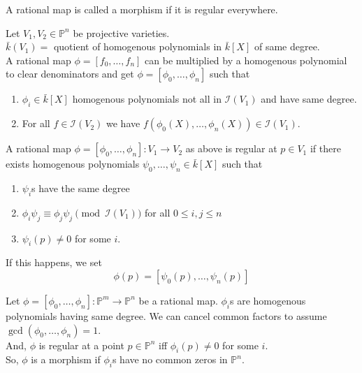 \documentclass[oneside, 12pt]{scrbook}
\newcommand{\I}{\mathcal{I}}
\newcommand{\PP}{\mathbb{P}}
\theoremstyle{theorem}
\begin{document}
\begin{definition}
A rational map is called a morphism if it is regular everywhere.
\end{definition}

\begin{remark}
Let $V_{1},V_{2} \in \PP^n$ be projective varieties. \\
$\bar{k}(V_{1}) = $ quotient of homogenous polynomials in $\bar{k}[X]$ of same degree.\\ 
A rational map $\phi = [f_{0}, \hdots , f_{n}]$ can be multiplied by a homogenous polynomial to clear denominators and get $\phi = [\phi_{0} , \hdots ,  \phi_{n}]$ such that 
\begin{enumerate}
\item $\phi_{i} \in \bar{k}[X]$ homogenous polynomials not all in $\I(V_{1})$ and have same degree.
\item For all $f \in \I(V_{2})$ we have $f(\phi_{0}(X), \hdots , \phi_{n}(X)) \in \I(V_{1})$. 
\end{enumerate}
\end{remark}

\begin{definition}
A rational map $\phi = [\phi_{0} , \hdots , \phi_{n}]: V_{1} \rightarrow V_{2}$ as  above is regular at $p \in V_{1}$ if there exists homogenous polynomials $\psi_{0},\hdots , \psi_{n} \in \bar{k}[X]$ such that 
\begin{enumerate}
\item $\psi_{i}$s have the same degree 
\item $\phi_{i}\psi_{j} \equiv \phi_{j}\psi_{j} \pmod{\I(V_{1})}$ for all $0  \le i,j \le n$
\item $\psi_{i}(p) \neq 0$ for some $i$.
\end{enumerate}
If this happens, we set $$\phi(p) = [\psi_{0}(p), \hdots , \psi_{n}(p)]$$
\end{definition}

\begin{remark}
Let $\phi= [\phi_{0}, \hdots , \phi_{n}]: \PP^m \rightarrow \PP^n$ be a rational map. $\phi_{i}$s are homogenous polynomials having same degree. We can cancel common factors to assume $\gcd(\phi_{0} , \hdots , \phi_{n})=1$. \\

And, $\phi$ is regular at a point $p \in \PP^n$ iff $\phi_{i}(p) \neq 0$ for some $i$.  \\
So, $\phi$ is a morphism if $\phi_{i}$s have no common zeros in $\PP^n$. 
\end{remark}
\end{document}
